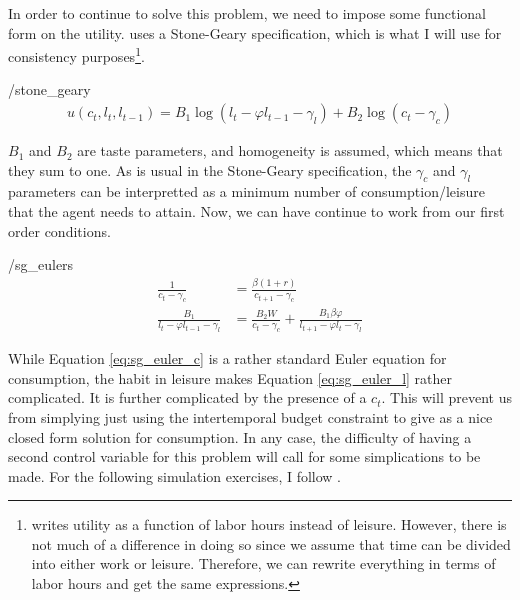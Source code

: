 \documentclass[ProjectMMD]{subfiles}
\begin{document}
In order to continue to solve this problem, we need to impose some functional form on the utility. \cite{bover1991relaxing} uses a Stone-Geary specification, which is what I will use for consistency purposes\footnote{\cite{bover1991relaxing} writes utility as a function of labor hours instead of leisure. However, there is not much of a difference in doing so since we assume that time can be divided into either work or leisure. Therefore, we can rewrite everything in terms of labor hours and get the same expressions.}.
\begin{verbatimwrite}{\EqDir/stone_geary}
  \begin{align}
    u(c_t, l_t, l_{t-1}) = B_1 \log \left(l_t - \varphi l_{t-1} - \gamma_l \right)+  B_2 \log \left(c_t - \gamma_c \right)  \label{eq:sg}
  \end{align}
\end{verbatimwrite}

$B_1$ and $B_2$ are taste parameters, and homogeneity is assumed, which means that they sum to one. As is usual in the Stone-Geary specification, the $\gamma_c$ and $\gamma_l$ parameters can be interpretted as a minimum number of consumption/leisure that the agent needs to attain. Now, we can have continue to work from our first order conditions.

\begin{verbatimwrite}{\EqDir/sg_eulers}
  \begin{align}
    \frac{1}{c_t -\gamma_c} &=\frac{\beta(1+r)}{c_{t+1}-\gamma_c} \label{eq:sg_euler_c} \\
    \frac{B_1}{l_t - \varphi l_{t-1} - \gamma_l} &= \frac{B_2 W}{c_t - \gamma_c} + \frac{B_1 \beta \varphi}{l_{t+1}-\varphi l_t - \gamma_l} \label{eq:sg_euler_l}
  \end{align}
\end{verbatimwrite}

While Equation \eqref{eq:sg_euler_c} is a rather standard Euler equation for consumption, the habit in leisure makes Equation \eqref{eq:sg_euler_l} rather complicated. It is further complicated by the presence of a $c_t$. This will prevent us from simplying just using the intertemporal budget constraint to give as a nice closed form solution for consumption. In any case, the difficulty of having a second control variable for this problem will call for some simplications to be made. For the following simulation exercises, I follow \cite{bover1991relaxing}.

\hypertarget{Simulations}{}
\end{document}
